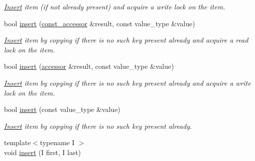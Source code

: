 \begin{DoxyCompactItemize}
\begin{DoxyCompactList}\small\item\em \hyperlink{structInsert}{Insert} item (if not already present) and acquire a write lock on the item. \end{DoxyCompactList}\item 
bool \hyperlink{classtbb_1_1interface5_1_1concurrent__hash__map_ab89cfe8fca962154a521eaae88b3a453}{insert} (\hyperlink{classtbb_1_1interface5_1_1concurrent__hash__map_1_1const__accessor}{const\+\_\+accessor} \&result, const value\+\_\+type \&value)
\begin{DoxyCompactList}\small\item\em \hyperlink{structInsert}{Insert} item by copying if there is no such key present already and acquire a read lock on the item. \end{DoxyCompactList}\item 
bool \hyperlink{classtbb_1_1interface5_1_1concurrent__hash__map_ae85ca36788e47e16f48bfe8590e6e360}{insert} (\hyperlink{classtbb_1_1interface5_1_1concurrent__hash__map_1_1accessor}{accessor} \&result, const value\+\_\+type \&value)
\begin{DoxyCompactList}\small\item\em \hyperlink{structInsert}{Insert} item by copying if there is no such key present already and acquire a write lock on the item. \end{DoxyCompactList}\item 
bool \hyperlink{classtbb_1_1interface5_1_1concurrent__hash__map_a8409ddd83cfe0a4de912f92a05081111}{insert} (const value\+\_\+type \&value)
\begin{DoxyCompactList}\small\item\em \hyperlink{structInsert}{Insert} item by copying if there is no such key present already. \end{DoxyCompactList}\item 
\hypertarget{classtbb_1_1interface5_1_1concurrent__hash__map_a1d6b7a7e3d4361bb12fb5185cd6d0e65}{}{\footnotesize template$<$typename I $>$ }\\void \hyperlink{classtbb_1_1interface5_1_1concurrent__hash__map_a1d6b7a7e3d4361bb12fb5185cd6d0e65}{insert} (I first, I last)\label{classtbb_1_1interface5_1_1concurrent__hash__map_a1d6b7a7e3d4361bb12fb5185cd6d0e65}


\end{DoxyCompactItemize}
